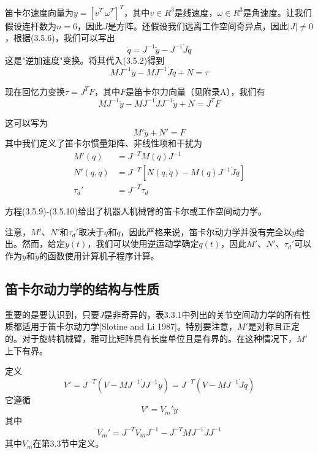\documentclass[12pt,a4paper]{ctexart}
\begin{document}
笛卡尔速度向量为$\dot{y} = [v^T \ \omega^T]^T$，其中$v \in R^3$是线速度，$\omega \in R^3$是角速度。让我们假设连杆数为$n = 6$，因此$J$是方阵。还假设我们远离工作空间奇异点，因此$|J| \neq 0$，根据(3.5.6)，我们可以写出
\begin{equation}
\ddot{q} = J^{-1}\ddot{y} - J^{-1}\dot{J}\dot{q}
\end{equation}
这是"逆加速度"变换。将其代入(3.5.2)得到
\begin{equation}
MJ^{-1}\ddot{y} - MJ^{-1}\dot{J}\dot{q} + N = \tau
\end{equation}

现在回忆力变换$\tau = J^T F$，其中$F$是笛卡尔力向量（见附录A），我们有
\begin{equation}
MJ^{-1}\ddot{y} - MJ^{-1}\dot{J}J^{-1}\dot{y} + N = J^T F
\end{equation}

这可以写为
\begin{equation}
M'\ddot{y} + N' = F
\end{equation}
其中我们定义了笛卡尔惯量矩阵、非线性项和干扰为
\begin{align}
M'(q) &= J^{-T}M(q)J^{-1} \\
N'(q,\dot{q}) &= J^{-T}[N(q,\dot{q}) - M(q)J^{-1}\dot{J}\dot{q}] \\
\tau_d' &= J^{-T}\tau_d
\end{align}

方程(3.5.9)-(3.5.10)给出了机器人机械臂的笛卡尔或工作空间动力学。

注意，$M'$、$N'$和$\tau_d'$取决于$q$和$\dot{q}$，因此严格来说，笛卡尔动力学并没有完全以$y$给出。然而，给定$y(t)$，我们可以使用逆运动学确定$q(t)$，因此$M'$、$N'$、$\tau_d'$可以作为$y$和$\dot{y}$的函数使用计算机子程序计算。

\subsection{笛卡尔动力学的结构与性质}

重要的是要认识到，只要$J$是非奇异的，表3.3.1中列出的关节空间动力学的所有性质都适用于笛卡尔动力学[Slotine and Li 1987]。特别要注意，$M'$是对称且正定的。对于旋转机械臂，雅可比矩阵具有长度单位且是有界的。在这种情况下，$M'$上下有界。

定义
\begin{equation}
V' = J^{-T}(V - MJ^{-1}\dot{J}J^{-1}\dot{y}) = J^{-T}(V - MJ^{-1}\dot{J}\dot{q})
\end{equation}
它遵循
\begin{equation}
V' = V_m'\dot{y}
\end{equation}
其中
\begin{equation}
V_m' = J^{-T}V_m J^{-1} - J^{-T}M J^{-1}\dot{J} J^{-1}
\end{equation}
其中$V_m$在第3.3节中定义。
\end{document}
